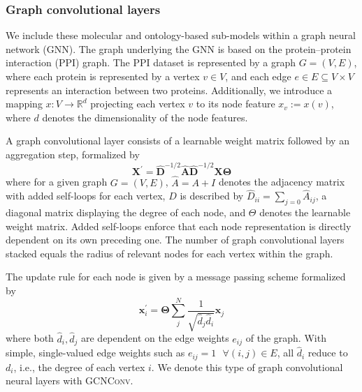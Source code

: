\documentclass{bioinfo}
\renewcommand{\cite}{\citep}
\begin{document}
\subsubsection{Graph convolutional layers}

We include these molecular and ontology-based sub-models within a
graph neural network (GNN). The graph underlying the GNN is based on
the protein--protein interaction (PPI) graph. The PPI dataset is
represented by a graph $G=(V,E)$, where each protein is represented by
a vertex $v\in V$, and each edge $e\in E\subseteq V\times V$
represents an interaction between two proteins. Additionally, we
introduce a mapping $x:V\rightarrow\mathbb{R}^{d}$ projecting each
vertex $v$ to its node feature $x_v := x(v)$, where $d$ denotes the
dimensionality of the node features.
 
A graph convolutional layer \cite{GCNConv} consists of a learnable
weight matrix followed by an aggregation step, formalized by
\begin{equation}
	\mathbf{X}^{\prime} = \mathbf{\hat{D}}^{-1/2} \mathbf{\hat{A}}
	\mathbf{\hat{D}}^{-1/2} \mathbf{X} \mathbf{\Theta}
\end{equation}
where for a given graph $G=(V,E)$, $\hat{A} = A + I$ denotes the
adjacency matrix with added self-loops for each vertex, $D$ is
described by $\hat{D}_{ii} = \sum_{j=0} \hat{A}_{ij}$, a diagonal
matrix displaying the degree of each node, and $\Theta$ denotes the
learnable weight matrix. Added self-loops enforce that each node
representation is directly dependent on its own preceding one. The
number of graph convolutional layers stacked equals the radius of
relevant nodes for each vertex within the graph.

The update rule for each node is given by a message passing scheme
formalized by
\begin{equation}
	\mathbf{x}^{\prime}_i = \mathbf{\Theta} \sum^{N}_{j}
	\frac{1}{\sqrt{\hat{d}_j \hat{d}_i}} \mathbf{x}_j
\end{equation}
where both $\hat{d}_i, \hat{d}_j$ are dependent on the edge weights
$e_{ij}$ of the graph. With simple, single-valued edge weights such as
$e_{ij}=1 \text{ }\forall (i,j)\in E$, all $\hat{d}_i$ reduce to
$d_i$, i.e., the degree of each vertex $i$. We denote this type of
graph convolutional neural layers with \textsc{GCNConv}.
\end{document}
